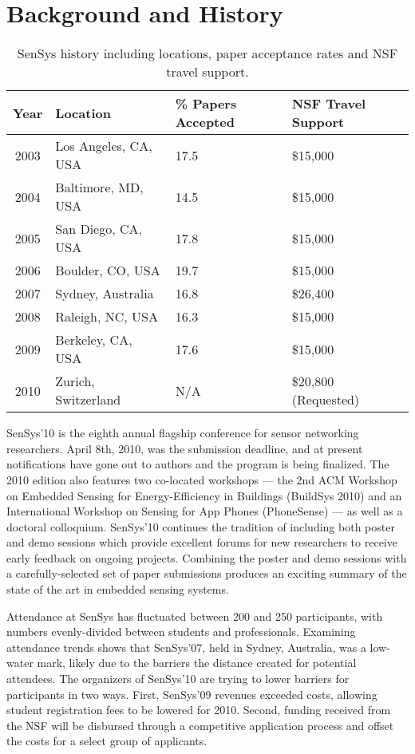 \documentclass[11pt,letterpaper]{article}
\begin{document}
\section*{Background and History}

\begin{table}[t]
\begin{center}
\begin{tabular}{|c|lll|}
\hline
\textbf{Year} & \textbf{Location} & \textbf{\% Papers Accepted} & \textbf{NSF
Travel Support} \\
\hline \hline
2003 & Los Angeles, CA, USA & 17.5 & \$15,000 \\
2004 & Baltimore, MD, USA & 14.5 & \$15,000 \\
2005 & San Diego, CA, USA & 17.8 & \$15,000 \\
2006 & Boulder, CO, USA & 19.7 & \$15,000 \\
2007 & Sydney, Australia & 16.8 & \$26,400 \\
2008 & Raleigh, NC, USA & 16.3 & \$15,000 \\
2009 & Berkeley, CA, USA & 17.6 & \$15,000 \\
2010 & Zurich, Switzerland & N/A & \$20,800 (Requested) \\
\hline
\end{tabular}
\end{center}
\caption{SenSys history including locations, paper acceptance rates and
NSF travel support.}
\label{table-history}
\end{table}

SenSys'10 is the eighth annual flagship conference for sensor networking
researchers. April 8th, 2010, was the submission deadline, and at present
notifications have gone out to authors and the program is being finalized.
The 2010 edition also features two co-located workshops --- the 2nd ACM
Workshop on Embedded Sensing for Energy-Efficiency in Buildings (BuildSys
2010) and an International Workshop on Sensing for App Phones (PhoneSense)
--- as well as a doctoral colloquium. SenSys'10 continues the tradition of
including both poster and demo sessions which provide excellent forums for
new researchers to receive early feedback on ongoing projects. Combining the
poster and demo sessions with a carefully-selected set of paper submissions
produces an exciting summary of the state of the art in embedded sensing
systems.

Attendance at SenSys has fluctuated between 200 and 250 participants, with
numbers evenly-divided between students and professionals. Examining
attendance trends shows that SenSys'07, held in Sydney, Australia, was a
low-water mark, likely due to the barriers the distance created for potential
attendees. The organizers of SenSys'10 are trying to lower barriers for
participants in two ways. First, SenSys'09 revenues exceeded costs, allowing
student registration fees to be lowered for 2010. Second, funding received
from the NSF will be disbursed through a competitive application process and
offset the costs for a select group of applicants.
\end{document}
